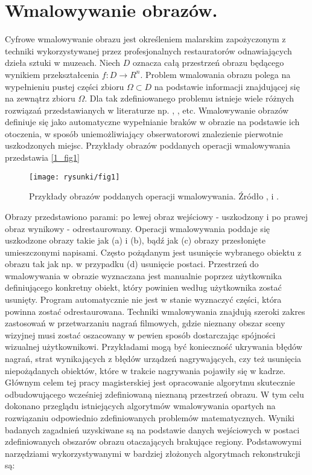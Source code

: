 \documentclass[12pt, twoside, openany]{report}
\theoremstyle{definition}
\begin{document}
\section{Wmalowywanie obrazów.}
Cyfrowe wmalowywanie obrazu jest określeniem malarskim zapożyczonym z techniki wykorzystywanej przez profesjonalnych restauratorów odnawiających dzieła sztuki w muzeach. Niech $D$ oznacza całą przestrzeń obrazu będącego wynikiem przekształcenia $f: D \rightarrow R^{n}$. Problem wmalowania obrazu polega na wypełnieniu pustej części zbioru $\Omega \subset D$ na podstawie informacji znajdującej się na zewnątrz zbioru $\Omega$. Dla tak zdefiniowanego problemu istnieje wiele różnych rozwiązań przedstawianych w literaturze np. \cite{SalientStrucTexProp}, \cite{BertalmioNavierStokes}, \cite{arias2011variational} etc. Wmalowywanie obrazów definiuje się jako automatyczne wypełnianie braków w obrazie na podstawie ich otoczenia, w sposób uniemożliwiający obserwatorowi znalezienie pierwotnie uszkodzonych miejsc. Przykłady obrazów poddanych operacji wmalowywania przedstawia \autoref{1_fig1} 
\begin{figure}[!h]
	\centering
	\texttt{[image: rysunki/fig1]}
	\caption{Przykłady obrazów poddanych operacji wmalowywania. Źródło \cite{BertalmioNavierStokes}, \cite{bertalmio2000image} i \cite{patwardhan2007video}.}
	\label{1_fig1}
\end{figure}
\par
Obrazy przedstawiono parami: po lewej obraz wejściowy - uszkodzony i po prawej obraz wynikowy - odrestaurowany. Operacji wmalowywania poddaje się uszkodzone obrazy takie jak (a) i (b), bądź jak (c) obrazy przesłonięte umieszczonymi napisami. Często pożądanym jest usunięcie wybranego obiektu z obrazu tak jak np. w przypadku (d) usunięcie postaci. Przestrzeń do wmalowywania w obrazie wyznaczana jest manualnie poprzez użytkownika definiującego konkretny obiekt, który powinien według użytkownika zostać usunięty. Program automatycznie nie jest w stanie wyznaczyć części, która powinna zostać odrestaurowana. 
Techniki wmalowywania znajdują szeroki zakres zastosowań w przetwarzaniu nagrań filmowych, gdzie nieznany obszar sceny wizyjnej musi zostać oszacowany w pewien sposób dostarczając spójności wizualnej użytkownikowi. Przykładami mogą być konieczność ukrywania błędów nagrań, strat wynikających z błędów urządzeń nagrywających, czy też usunięcia niepożądanych obiektów, które w trakcie nagrywania pojawiły się w kadrze. Głównym celem tej pracy magisterskiej jest opracowanie algorytmu skutecznie odbudowującego wcześniej zdefiniowaną nieznaną przestrzeń obrazu. W tym celu dokonano przeglądu istniejących algorytmów wmalowywania opartych na rozwiązaniu odpowiednio zdefiniowanych problemów matematycznych. Wyniki badanych zagadnień uzyskiwane są na podstawie danych wejściowych w postaci zdefiniowanych obszarów obrazu otaczających brakujące regiony. Podstawowymi narzędziami wykorzystywanymi w bardziej złożonych algorytmach rekonstrukcji są:
\end{document}
